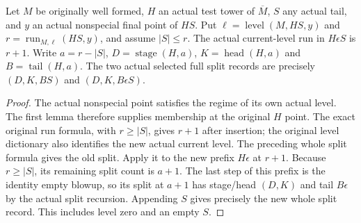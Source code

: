\begin{theorem}
\label{hir:original-interior-crossing-selected-splits}
\leanok
{}
Let $M$ be originally well formed, $H$ an actual test tower of $\overline M$,
$S$ any actual tail, and $y$ an actual nonspecial final point of $HS$.
Put $\ell=\operatorname{level}(M,HS,y)$ and
$r=\operatorname{run}_{M,\ell}(HS,y)$, and assume $|S|\leq r$.
The actual current-level run in $H\epsilon S$ is $r+1$.  Write
$a=r-|S|$, $D=\operatorname{stage}(H,a)$, $K=\operatorname{head}(H,a)$ and
$B=\operatorname{tail}(H,a)$.  The two actual selected full split records
are precisely $(D,K,BS)$ and $(D,K,B\epsilon S)$.
\end{theorem}
\begin{proof}
The actual nonspecial point satisfies the regime of its own actual level.
The first lemma therefore supplies membership at the original $H$ point.
The exact original run formula, with $r\geq|S|$, gives $r+1$ after insertion;
the original level dictionary also identifies the new actual current level.
The preceding whole split formula gives the old split.  Apply it to the new
prefix $H\epsilon$ at $r+1$.  Because $r\geq|S|$, its remaining split count
is $a+1$.  The last step of this prefix is the identity empty blowup, so
its split at $a+1$ has stage/head $(D,K)$ and tail $B\epsilon$ by the actual
split recursion.  Appending $S$ gives precisely the new whole split record.
This includes level zero and an empty $S$.
\end{proof}

